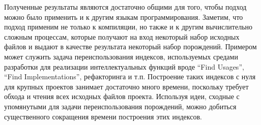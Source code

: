 Полученные результаты являются достаточно общими для того, чтобы подход можно было применить и к другим языкам программирования. Заметим, что подход применим не только к компиляции, но также и к другим вычислительно сложным процессам, которые получают на вход некоторый набор исходных файлов и выдают в качестве результата некоторый набор порождений. Примером может служить задача переиспользования индексов, используемых средами разработки для реализации интеллектуальных функций вроде ``Find Usages'', ``Find Implementations'', рефакторинга и т.п. Построение таких индексов с нуля для крупных проектов занимает достаточно много времени, поскольку требует обхода и чтения всех исходных файлов проекта. Используя идеи, сходные с упомянутыми для задачи переиспользования порождений, можно добиться существенного сокращения времени построения этих индексов.